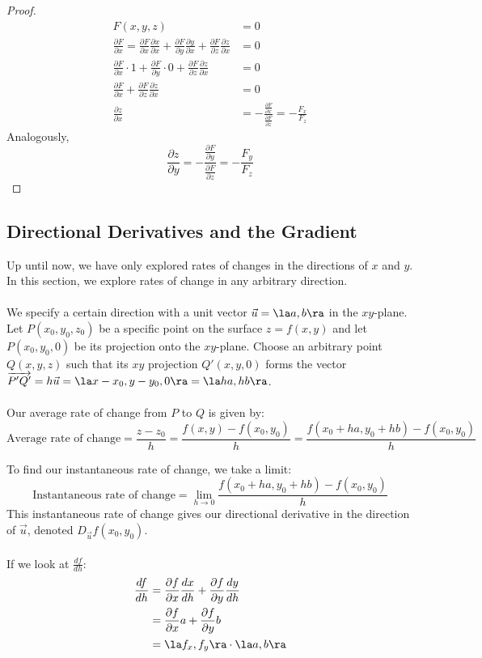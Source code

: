 \documentclass[12pt]{article}
\begin{document}
\begin{proof}
\[
\begin{aligned}
F(x,y,z) &= 0 \\
\frac{\partial F}{\partial x} = \frac{\partial F}{\partial x}\frac{\partial x}{\partial x} + \frac{\partial F}{\partial y}\frac{\partial y}{\partial x} + \frac{\partial F}{\partial z}\frac{\partial z}{\partial x} &= 0\\
\frac{\partial F}{\partial x}\cdot 1 + \frac{\partial F}{\partial y}\cdot 0 + \frac{\partial F}{\partial z}\frac{\partial z}{\partial x} &= 0 \\
\frac{\partial F}{\partial x} + \frac{\partial F}{\partial z}\frac{\partial z}{\partial x} &= 0 \\
\frac{\partial z}{\partial x} &= -\frac{\frac{\partial F}{\partial x}}{\frac{\partial F}{\partial z}} = -\frac{F_x}{F_z}
\end{aligned}
\]
Analogously, \[ \frac{\partial z}{\partial y} = -\frac{\frac{\partial F}{\partial y}}{\frac{\partial F}{\partial z}} = -\frac{F_y}{F_z} \]
\end{proof}

\subsection{Directional Derivatives and the Gradient}
Up until now, we have only explored rates of changes in the directions of $x$ and $y$. In this section, we explore rates of change in any arbitrary direction. \\\\

We specify a certain direction with a unit vector $\vec{u} = \la a,b \ra$ in the $xy$-plane. Let $P(x_0,y_0,z_0)$ be a specific point on the surface $z=f(x,y)$ and let $P(x_0,y_0,0)$ be its projection onto the $xy$-plane. Choose an arbitrary point $Q(x,y,z)$ such that its $xy$ projection $Q'(x,y,0)$ forms the vector $\overrightarrow{P'Q'} = h\vec{u} = \la x-x_0, y-y_0,0 \ra = \la ha, hb \ra$.  \\ \\
Our average rate of change from $P$ to $Q$ is given by: \[ \text{Average rate of change} = \frac{z-z_0}{h} = \frac{f(x,y) - f(x_0,y_0)}{h} = \frac{f(x_0 + ha,y_0 + hb) - f(x_0,y_0)}{h} \]

To find our instantaneous rate of change, we take a limit: \[ \text{Instantaneous rate of change} = \lim_{h \to 0} \frac{f(x_0 + ha,y_0 + hb) - f(x_0,y_0)}{h} \]
This instantaneous rate of change gives our directional derivative in the direction of $\vec{u}$, denoted $D_{\vec{u}}f(x_0,y_0)$. \\ \\
If we look at $\frac{df}{dh}$:
\[ 
\begin{aligned}
\frac{df}{dh} &= \frac{\partial f}{\partial x}\frac{dx}{dh} + \frac{\partial f}{\partial y}\frac{dy}{dh} \\
&= \frac{\partial f}{\partial x}a + \frac{\partial f}{\partial y}b \\
&= \la f_x, f_y \ra \cdot \la a,b \ra 
\end{aligned}
\]
\end{document}
